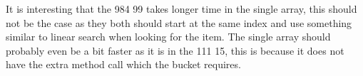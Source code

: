 \documentclass[a4paper,11pt]{article}
\begin{document}
\FloatBarrier{\noindent}
\newline
It is interesting that the 984 99 takes longer time in the single array, this should not be the case as they both should start at the same index and use something similar to linear search when looking for the item. The single array should probably even be a 
bit faster as it is in the 111 15, this is because it does not have the extra method call which the bucket requires.
\end{document}
